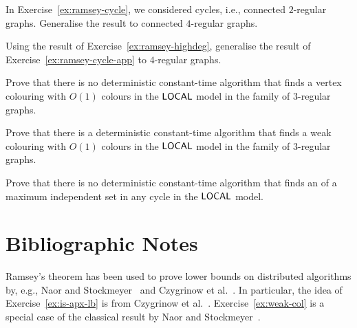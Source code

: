 \begin{ex}\label{ex:ramsey-highdeg}
    In Exercise~\ref{ex:ramsey-cycle}, we considered cycles, i.e., connected $2$-regular graphs. Generalise the result to connected $4$-regular graphs.

\end{ex}

\begin{ex}\label{ex:ramsey-highdeg-app}
    Using the result of Exercise~\ref{ex:ramsey-highdeg}, generalise the result of Exercise~\ref{ex:ramsey-cycle-app} to $4$-regular graphs.
\end{ex}

\begin{ex}
    Prove that there is no deterministic constant-time algorithm that finds a vertex colouring with $O(1)$ colours in the $\textup{\sffamily LOCAL}$ model in the family of $3$-regular graphs.

\end{ex}

\begin{exs}\label{ex:weak-col}
    Prove that there is a deterministic constant-time algorithm that finds a weak colouring with $O(1)$ colours in the $\textup{\sffamily LOCAL}$ model in the family of $3$-regular graphs.
\end{exs}

\begin{exs}\label{ex:is-apx-lb}
    Prove that there is no deterministic constant-time algorithm that finds an  of a maximum independent set in any cycle in the $\textup{\sffamily LOCAL}$ model.
    
\end{exs}


\section{Bibliographic Notes}

Ramsey's theorem has been used to prove lower bounds on distributed algorithms by, e.g., Naor and Stockmeyer~\cite{naor95what} and Czygrinow et al.~\cite{czygrinow08fast}. In particular, the idea of Exercise~\ref{ex:is-apx-lb} is from Czygrinow et al.~\cite{czygrinow08fast}. Exercise~\ref{ex:weak-col} is a special case of the classical result by Naor and Stockmeyer~\cite{naor95what}.
